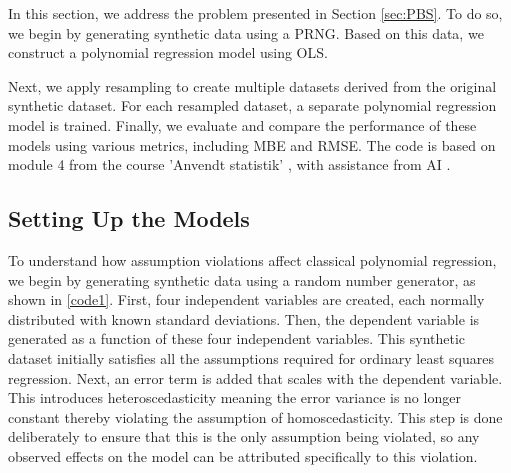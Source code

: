 


In this section, we address the problem presented in Section \ref{sec:PBS}. To do so, we begin by generating synthetic data using a PRNG. Based on this data, we construct a polynomial regression model using OLS.

\noindent Next, we apply resampling to create multiple datasets derived from the original synthetic dataset. For each resampled dataset, a separate polynomial regression model is trained. Finally, we evaluate and compare the performance of these models using various metrics, including MBE and RMSE. The code is based on module 4 from the course 'Anvendt statistik' \cite{ASTA}, with assistance from AI \cite{AI}.

\subsection{Setting Up the Models}
To understand how assumption violations affect classical polynomial regression, we begin by generating synthetic data using a random number generator, as shown in \autoref{code1}. First, four independent variables are created, each normally distributed with known standard deviations. Then, the dependent variable is generated as a function of these four independent variables. This synthetic dataset initially satisfies all the assumptions required for ordinary least squares regression. Next, an error term is added that scales with the dependent variable. This introduces heteroscedasticity meaning the error variance is no longer constant thereby violating the assumption of homoscedasticity. This step is done deliberately to ensure that this is the only assumption being violated, so any observed effects on the model can be attributed specifically to this violation.
\\\\


